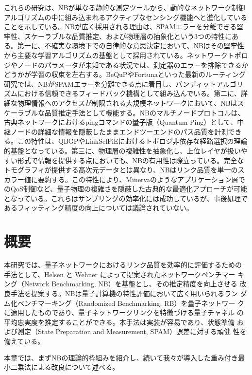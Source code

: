 \documentclass[12pt,a4paper,titlepage,dvipdfmx]{article}
\begin{document}
これらの研究は、NBが単なる静的な測定ツールから、動的なネットワーク制御アルゴリズムの中に組み込まれるアクティブなセンシング機能へと進化していることを示している。NBが広く採用される理由は、SPAMエラーを分離できる堅牢性、スケーラブルな品質推定、および物理層の抽象化という3つの特性にある。第一に、不確実な環境下での自律的な意思決定において、NBはその堅牢性から主要な学習アルゴリズムの基盤として採用されている。ネットワークトポロジやノードのパラメータが未知である状況では、測定器のエラーを排除できるかどうかが学習の収束を左右する。BeQuP\cite{wang2025learning}やFortuna\cite{li2025fortuna}といった最新のルーティング研究では、NBがSPAMエラーを分離できる点に着目し、バンディットアルゴリズムにおける信頼できるフィードバック機構として組み込んでいる。第二に、詳細な物理情報へのアクセスが制限される大規模ネットワークにおいて、NBはスケーラブルな品質推定手法として機能する。NBのマルチノードプロトコルは、古典ネットワークにおけるpingコマンドの量子版（Quantum Ping）として、中継ノードの詳細な情報を隠蔽したままエンドツーエンドのパス品質を計測できる\cite{helsen2023benchmarking}。この特性は、QBGP\cite{liu2024quantum}やLinkSelFiE\cite{liu2024linkselfie}におけるトポロジ非依存な経路選択の理論的基盤となっている。第三に、物理層の複雑性を抽象化し、上位レイヤが扱いやすい形式で情報を提供する点においても、NBの有用性は際立っている。完全なトモグラフィが提供する高次元データとは異なり、NBはリンク品質を単一のスカラー値に要約する。この特性により、Minerva\cite{li2024minerva}のようなアプリケーション層でのQoS制御など、量子物理の複雑さを隠蔽した古典的な最適化アプローチが可能となっている。これらはサンプリングの効率化には成功しているが、事後処理であるフィッティング精度の向上については議論されていない。
\newpage



\section{概要}
\label{sec:概要}
本研究では、量子ネットワークにおけるリンク品質を効率的に評価するための
手法として、Helsen と Wehner によって提案されたネットワークベンチマー
キング（Network Benchmarking, NB）を基盤とし、その推定精度を向上させる
改良手法を提案する。NBは量子計算機の特性評価において広く用いられるラン
ダム化ベンチマーキング（Randomized Benchmarking, RB）を量子ネットワー
クに適用したものであり、量子ネットワークリンクを特徴づける量子チャネル
の平均忠実度を推定することができる。本手法は実装が容易であり、状態準備
および測定（State Preparation and Measurement, SPAM）誤差に対する頑健
性を備えている。

本章では、まずNBの理論的枠組みを紹介し、続いて我々が導入した重み付き最
小二乗法による改良について述べる。
\end{document}

